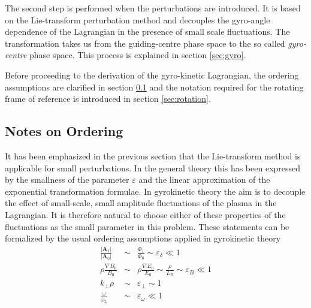\documentclass[a4paper,10pt]{article}
\newcommand{\st}[1]{\mathrm{#1}} %
\begin{document}
The second step is performed when the perturbations are introduced. It is based on the Lie-transform perturbation method and decouples the gyro-angle dependence of the Lagrangian in the presence of small scale fluctuations. The transformation takes us from the guiding-centre phase space to the so called \emph{gyro-centre} phase space. This process is explained in section \ref{sec:gyro}.

Before proceeding to the derivation of the gyro-kinetic Lagrangian, the ordering assumptions are clarified in section \ref{sec:ordering} and the notation required for the rotating frame of reference is introduced in section \ref{sec:rotation}.

\subsection{Notes on Ordering} \label{sec:ordering}
It has been emphasized in the previous section that the Lie-transform method is applicable for small perturbations. In the general theory this has been expressed by the smallness of the parameter $\varepsilon$ and the linear approximation of the exponential transformation formulae. In gyrokinetic theory the aim is to decouple the effect of small-scale, small amplitude fluctuations of the plasma in the Lagrangian. It is therefore natural to choose either of these properties of the fluctuations as the small parameter in this problem. These statements can be formalized by the usual ordering assumptions applied in gyrokinetic theory \cite{brizard}
\begin{eqnarray}
	\frac{|\mathbf{A}_1|}{|\mathbf{A}_0|} &\sim& \frac{\Phi_1}{\Phi_0} \sim \varepsilon_{\delta} \ll 1 \\ \label{eq:eps_delta}
	\rho \frac{\nabla B_0}{B_0} &\sim& \rho \frac{\nabla E_0}{E_0} \sim \frac{\rho}{L_B} \sim \varepsilon_B  \ll 1\\ \label{eq:eps_B}
	k_{\perp} \rho &\sim& \varepsilon_{\perp} \sim 1 \\ \label{eq:eps_perp}
	\frac{\omega}{\omega_{\st{L}}} &\sim& \varepsilon_{\omega} \ll 1 \label{eq:eps_omega}
\end{eqnarray}
\end{document}
